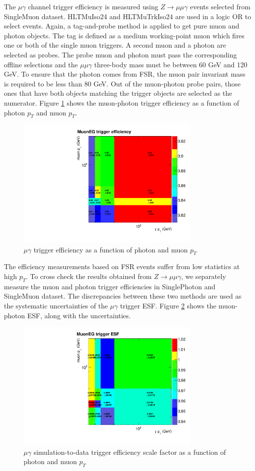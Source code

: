 \documentclass[thesis.tex]{subfiles}
\renewcommand\_{\textunderscore\allowbreak}
\begin{document}
The $\mu\gamma$ channel trigger efficiency is measured using $Z\rightarrow\mu\mu\gamma$ events selected from SingleMuon dataset. 
HLT\_MuIso24 and HLT\_MuTrkIso24 are used in a logic OR to select events. 
Again, a tag-and-probe method is applied to get pure muon and photon objects. 
The tag is defined as a medium working-point muon which fires one or both of the single muon triggers.
 A second muon and a photon are selected as probes. 
 The probe muon and photon must pass the corresponding offline selections and the $\mu\mu\gamma$ three-body mass must be between 60 GeV and 120 GeV. 
 To ensure that the photon comes from FSR, the muon pair invariant mass is required to be less than 80 GeV. 
 Out of the muon-photon probe pairs, those ones that have both objects matching the trigger objects are selected as the numerator. 
 Figure \ref{fig:mgtriggereff} shows the muon-photon trigger efficiency as a function of photon $p_{T}$ and muon $p_{T}$. 

\begin{figure}[tb]
 \centering
 \includegraphics[width=0.8\textwidth]{Figures/mgTrigger_efficiency.pdf}
  \caption{$\mu\gamma$ trigger efficiency as a function of photon and muon $p_{T}$ }
  \label{fig:mgtriggereff}
\end{figure}

The efficiency measurements based on FSR events suffer from low statistics at high $p_{T}$. To cross check the results obtained from $Z\rightarrow\mu\mu\gamma$, we separately measure the muon and photon trigger efficiencies in SinglePhoton and SingleMuon dataset. The discrepancies between these two methods are used as the systematic uncertainties of the $\mu\gamma$ trigger ESF. Figure \ref{fig:mgtriggerESF} shows the muon-photon ESF, along with the uncertainties. 


\begin{figure}[tb]
 \centering
 \includegraphics[width=0.8\textwidth]{Figures/mgTrigger_ESF.pdf}
  \caption{$\mu\gamma$ simulation-to-data trigger efficiency scale factor as a function of photon and muon $p_{T}$ }
  \label{fig:mgtriggerESF}
\end{figure}
\end{document}

